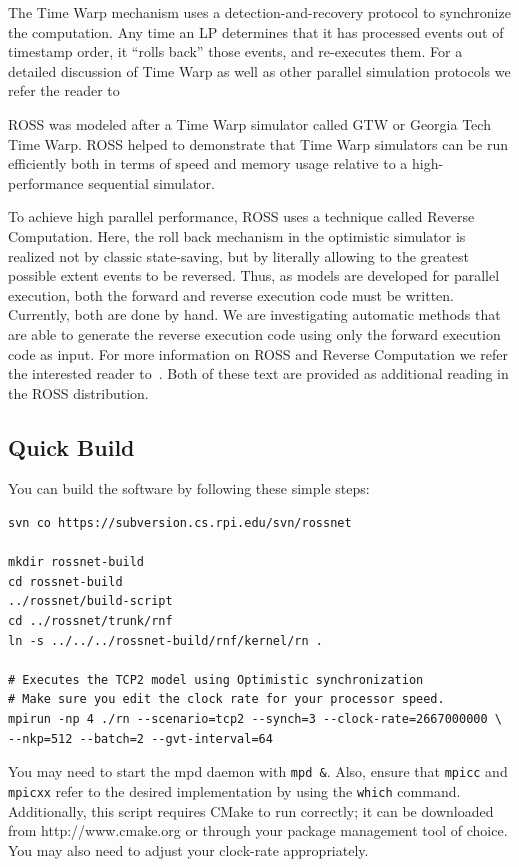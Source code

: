 \documentclass[12pt]{article}
\begin{document}
The Time Warp mechanism uses a detection-and-recovery protocol to synchronize
the computation.  Any time an LP determines that it has processed events out
of timestamp order, it ``rolls back'' those events, and re-executes them. For
a detailed discussion of Time Warp as well as other parallel simulation
protocols we refer the reader to~\cite{fujimoto-cacm-1990}

ROSS was modeled after a Time Warp simulator called GTW or Georgia Tech Time
Warp\cite{das-wsc-1994}. ROSS helped to demonstrate that Time Warp simulators
can be run efficiently both in terms of speed and memory usage relative to a
high-performance sequential simulator.

To achieve high parallel performance, ROSS uses a technique called Reverse
Computation. Here, the roll back mechanism in the optimistic simulator is
realized not by classic state-saving, but by literally allowing to the
greatest possible extent events to be reversed. Thus, as models are developed
for parallel execution, both the forward and reverse execution code must be
written. Currently, both are done by hand. We are investigating automatic
methods that are able to generate the reverse execution code using only the
forward execution code as input. For more information on ROSS and Reverse
Computation we refer the interested reader to~\cite{carothers-tomacs-1999,
  carothers-pads-2000}. Both of these text are provided as additional reading
in the ROSS distribution.

\subsection{Quick Build}

You can build the software by following these simple steps:

\begin{verbatim}
svn co https://subversion.cs.rpi.edu/svn/rossnet

mkdir rossnet-build
cd rossnet-build
../rossnet/build-script
cd ../rossnet/trunk/rnf
ln -s ../../../rossnet-build/rnf/kernel/rn .

# Executes the TCP2 model using Optimistic synchronization
# Make sure you edit the clock rate for your processor speed.
mpirun -np 4 ./rn --scenario=tcp2 --synch=3 --clock-rate=2667000000 \
--nkp=512 --batch=2 --gvt-interval=64
\end{verbatim}

You may need to start the mpd daemon with \texttt{mpd \&}.  Also, ensure that
\texttt{mpicc} and \texttt{mpicxx} refer to the desired implementation by
using the \texttt{which} command.  Additionally, this script requires CMake to
run correctly; it can be downloaded from http://www.cmake.org or through your
package management tool of choice. You may also need to adjust your clock-rate
appropriately.
\end{document}
